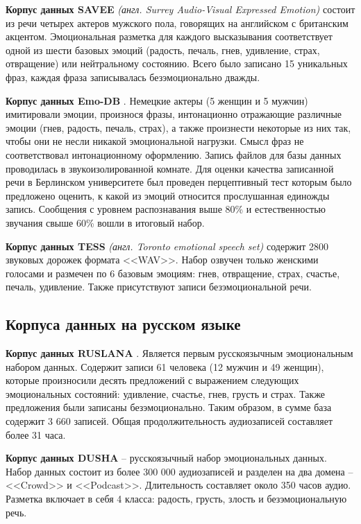 \textbf{Корпус данных  SAVEE} \cite{savee} \textit{(англ. Surrey Audio-Visual Expressed Emotion)} состоит из речи четырех актеров мужского пола, говорящих на английском с британским акцентом. Эмоциональная разметка для каждого высказывания соответствует одной из шести базовых эмоций (радость, печаль, гнев, удивление, страх, отвращение) или нейтральному состоянию. Всего было записано 15 уникальных фраз, каждая фраза записывалась безэмоционально дважды.

\textbf{Корпус данных Emo-DB} \cite{emodb}. Немецкие актеры (5 женщин и 5 мужчин) имитировали эмоции, произнося фразы, интонационно отражающие различные эмоции (гнев, радость, печаль, страх), а также произнести некоторые из них так, чтобы они не несли никакой эмоциональной нагрузки. Смысл фраз не соответствовал интонационному оформлению. Запись файлов для базы данных проводилась в звукоизолированной комнате. Для оценки качества записанной речи в Берлинском университете был проведен перцептивный тест которым было предложено оценить, к какой из эмоций относится прослушанная единожды запись. Сообщения с уровнем распознавания выше 80\% и естественностью звучания свыше 60\% вошли в итоговый набор.

\textbf{Корпус данных  TESS} \cite{tess} \textit{(англ. Toronto emotional speech set)} содержит 2800 звуковых дорожек формата <<WAV>>. Набор озвучен только женскими голосами и размечен по 6 базовым эмоциям: гнев, отвращение, страх, счастье, печаль, удивление. Также присутствуют записи безэмоциональной речи.
\subsection{Корпуса данных на русском языке}
\textbf{Корпус данных RUSLANA} \cite{ruslana}. Является первым русскоязычным эмоциональным набором данных. Содержит записи 61 человека (12 мужчин и 49 женщин), которые произносили десять предложений с выражением следующих эмоциональных состояний: удивление, счастье, гнев, грусть и страх. Также предложения были записаны безэмоционально. Таким образом, в сумме база содержит 3 660 записей. Общая продолжительность аудиозаписей составляет более 31 часа. 

\textbf{Корпус данных DUSHA} \cite{dusha} -- русскоязычный набор эмоциональных данных. Набор данных состоит из более 300 000 аудиозаписей и разделен на два домена -- <<Crowd>> и <<Podcast>>. Длительность составляет около 350 часов аудио. Разметка включает в себя 4 класса: радость, грусть, злость и безэмоциональную речь.

